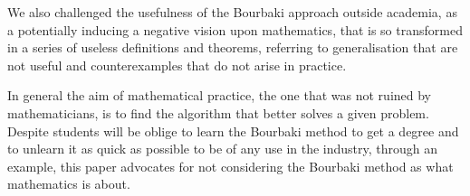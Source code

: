 \documentclass[]{scrartcl}
\begin{document}
We also challenged the usefulness of the Bourbaki approach outside academia, as a potentially inducing a negative vision upon mathematics, that is so transformed in a series of useless definitions and theorems, referring to generalisation that are not useful and counterexamples that do not arise in practice. 

In general the aim of mathematical practice, the one that was not ruined by mathematicians, is to find the algorithm that better solves a given problem. Despite students will be oblige to learn the Bourbaki method to get a degree and to unlearn it as quick as possible to be of any use in the industry, through an example, this paper advocates for not considering the Bourbaki method as what mathematics is about.

 

\end{document}
